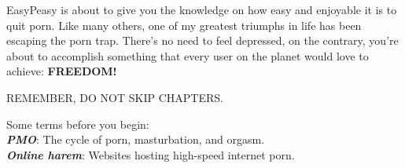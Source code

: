 \documentclass[easypeasy.tex]{subfiles}
\begin{document}
EasyPeasy is about to give you the knowledge on how easy and enjoyable it is to quit porn. Like many others, one of my greatest triumphs in life has been escaping the porn trap. There's no need to feel depressed, on the contrary, you're about to accomplish something that every user on the planet would love to achieve: \textbf{FREEDOM!}

REMEMBER, DO NOT SKIP CHAPTERS.

Some terms before you begin:\\
{\small \textbf{\textit{PMO}}: The cycle of porn, masturbation, and orgasm.\\
  \textbf{\textit{Online harem}}: Websites hosting high-speed internet porn.
  }
\end{document}
